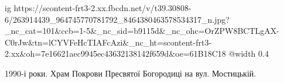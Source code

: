  
 
 
 
 

\ifcmt
  ig https://scontent-frt3-2.xx.fbcdn.net/v/t39.30808-6/263914439_964745770781792_8464380463578534317_n.jpg?_nc_cat=101&ccb=1-5&_nc_sid=b9115d&_nc_ohc=OrZPW8BCTLgAX-C0rJw&tn=lCYVFeHcTIAFcAzi&_nc_ht=scontent-frt3-2.xx&oh=7e16621aec9945ec43632138142f659d&oe=61B18C18
  @width 0.4
\fi

1990-і роки. Храм Покрови Пресвятої Богородиці на вул. Мостицькій.
